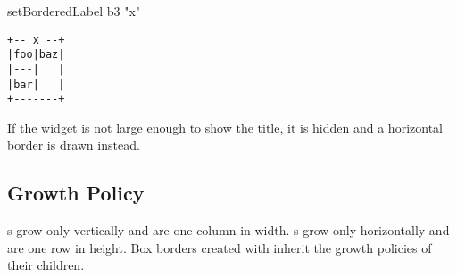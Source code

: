 \begin{haskellcode}
 setBorderedLabel b3 "x"
\end{haskellcode}

\begin{verbatim}
+-- x --+
|foo|baz|
|---|   |
|bar|   |
+-------+
\end{verbatim}

If the  widget is not large enough to show the title, it
is hidden and a horizontal border is drawn instead.

\subsection{Growth Policy}

s grow only vertically and are one column in width.
s grow only horizontally and are one row in height.  Box
borders created with  inherit the growth policies of
their children.

